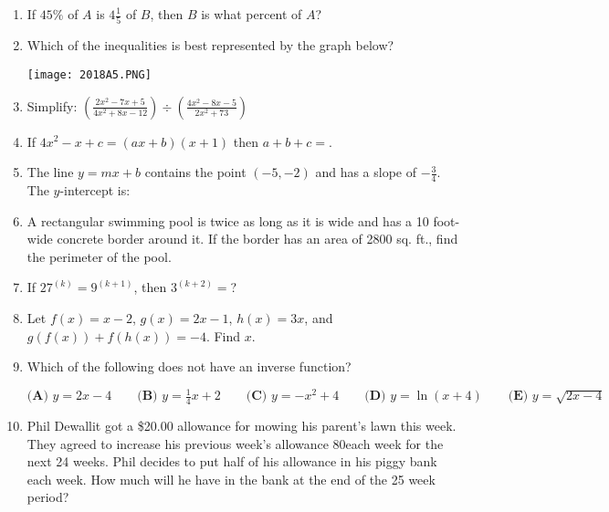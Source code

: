 \documentclass[../uilmath.tex]{subfiles}
\begin{document}
\begin{enumerate}[label=\bfseries\arabic*.]
        \item %
        If $45\%$ of $A$ is $4\frac{1}{5}$ of $B$, then $B$ is what percent of $A$?

        \item %
        Which of the inequalities is best represented by the graph below?
        \begin{center}
            \texttt{[image: 2018A5.PNG]}
        \end{center}

        \item %
        Simplify: $\left(\frac{2x^2-7x+5}{4x^2+8x-12}\right)\div \left(\frac{4x^2-8x-5}{2x^2+73}\right)$

        \item %
        If $4x^2-x+c = (ax+b)(x+1)$ then $a+b+c=$\blank .

        \item %
        The line $y=mx+b$ contains the point $(-5,-2)$ and has a slope of $-\frac{3}{4}$. The $y$-intercept is:

        \item %
        A rectangular swimming pool is twice as long as it is wide and has a 10 foot-wide concrete border around it.
        If the border has an area of 2800 sq. ft., find the perimeter of the pool.

        \item %
        If $27^{(k)}=9^{(k+1)}$, then $3^{(k+2)}=$?

        \item %
        Let $f(x)=x-2$, $g(x)=2x-1$, $h(x)=3x$, and $g(f(x))+f(h(x))=-4$. Find $x$.

        \item %
        Which of the following does not have an inverse function?

        $\textbf{(A) } y=2x-4 \qquad \textbf{(B) } y=\frac{1}{4}x+2 \qquad \textbf{(C) } y=-x^2+4 \qquad \textbf{(D) } y=\ln(x+4) \qquad \textbf{(E) }y=\sqrt{2x-4}$

        \item %
        Phil Dewallit got a \$20.00 allowance for mowing his parent's lawn this week. They agreed to increase his previous week's allowance 
        80\textcent  each week for the next 24 weeks. Phil decides to put half of his allowance in his piggy bank each week.
        How much will he have in the bank at the end of the 25 week period?


\end{enumerate}
\end{document}
